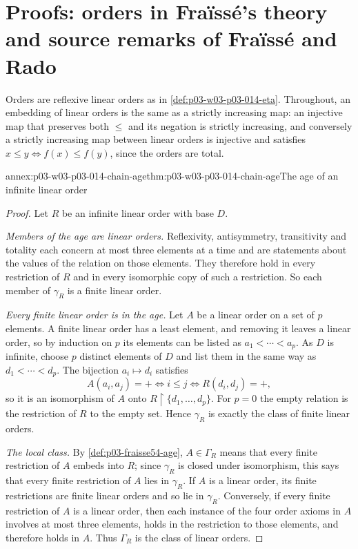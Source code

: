 \section{Proofs: orders in Fra\"iss\'e's theory and source remarks of Fra\"iss\'e and Rado}
\label{sec:annex-p03-w03-p03-014-orders}

Orders are reflexive linear orders as in \cref{def:p03-w03-p03-014-eta}.
Throughout, an embedding of linear orders is the same as a strictly
increasing map: an injective map that preserves both \(\leq\) and its
negation is strictly increasing, and conversely a strictly increasing map between
linear orders is injective and satisfies \(x\leq y\iff f(x)\leq f(y)\),
since the orders are total.

\begin{annexitem}{annex:p03-w03-p03-014-chain-age}{thm:p03-w03-p03-014-chain-age}{The age of an infinite linear order}
\begin{proof}
Let \(R\) be an infinite linear order with base \(D\).

\emph{Members of the age are linear orders.} Reflexivity, antisymmetry,
transitivity and totality each concern at most three elements at a time
and are statements about the values of the relation on those elements.
They therefore hold in every restriction of \(R\) and in every
isomorphic copy of such a restriction. So each member of \(\gamma_R\)
is a finite linear order.

\emph{Every finite linear order is in the age.} Let \(A\) be a linear
order on a set of \(p\) elements. A finite linear order has a least
element, and removing it leaves a linear order, so by induction on \(p\)
its elements can be listed as \(a_1<\cdots<a_p\). As \(D\) is
infinite, choose \(p\) distinct elements of \(D\) and list them in the
same way as \(d_1<\cdots<d_p\). The bijection \(a_i\mapsto d_i\)
satisfies
\[
 A(a_i,a_j)=+\iff i\leq j\iff R(d_i,d_j)=+,
\]
so it is an isomorphism of \(A\) onto \(R\mathbin{\upharpoonright}\{d_1,\ldots,d_p\}\).
For \(p=0\) the empty relation is the restriction of \(R\) to the empty
set. Hence \(\gamma_R\) is exactly the class of finite linear orders.

\emph{The local class.} By \cref{def:p03-fraisse54-age},
\(A\in\Gamma_R\) means that every finite restriction of \(A\) embeds
into \(R\); since \(\gamma_R\) is closed under isomorphism, this says
that every finite restriction of \(A\) lies in \(\gamma_R\). If \(A\)
is a linear order, its finite restrictions are finite linear orders and
so lie in \(\gamma_R\). Conversely, if every finite restriction of
\(A\) is a linear order, then each instance of the four order axioms in
\(A\) involves at most three elements, holds in the restriction to those
elements, and therefore holds in \(A\). Thus \(\Gamma_R\) is the class of
linear orders.
\end{proof}
\end{annexitem}

